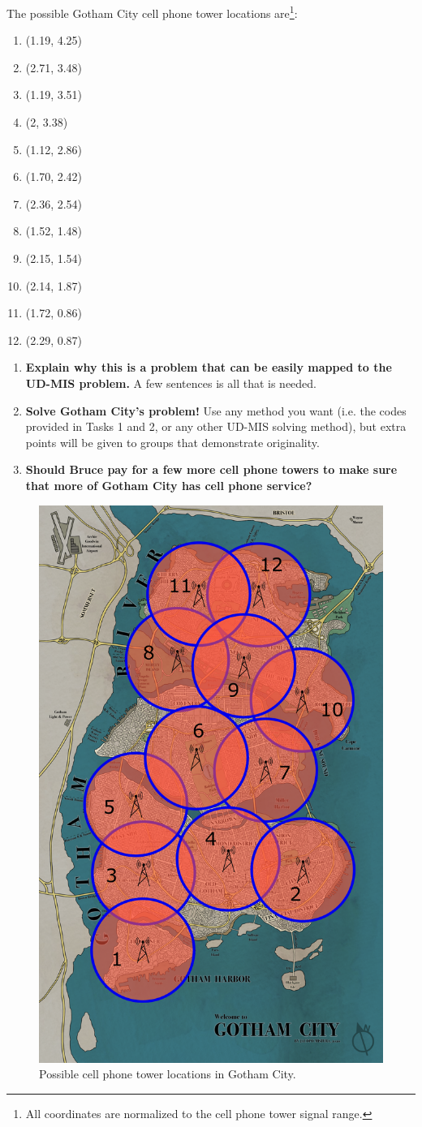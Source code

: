 \documentclass[12pt]{article}
\begin{document}
The possible Gotham City cell phone tower locations are\footnote{All coordinates are normalized to the cell phone tower signal range.}:
\begin{enumerate}
	\item (1.19, 4.25)
	\item (2.71, 3.48)
	\item (1.19, 3.51)
	\item (2, 3.38)
	\item (1.12, 2.86)
	\item (1.70, 2.42)
	\item (2.36, 2.54)
	\item (1.52, 1.48)
	\item (2.15, 1.54)
	\item (2.14, 1.87)
	\item (1.72, 0.86)
	\item (2.29, 0.87)
\end{enumerate}

\begin{enumerate}
	\item {\bf Explain why this is a problem that can be easily mapped to the UD-MIS problem.} A few sentences is all that is needed.
	\item {\bf Solve Gotham City's problem!} Use any method you want (i.e. the codes provided in Tasks 1 and 2, or any other UD-MIS solving method), but extra points will be given to groups that demonstrate originality.
	\item {\bf Should Bruce pay for a few more cell phone towers to make sure that more of Gotham City has cell phone service?}
\end{enumerate}

\begin{figure}
    \begin{center}
        \includegraphics[width=0.4\linewidth]{images/gothamcity.png}
    \end{center}
    \caption{Possible cell phone tower locations in Gotham City.} \label{fig:gotham}
\end{figure}
\end{document}
